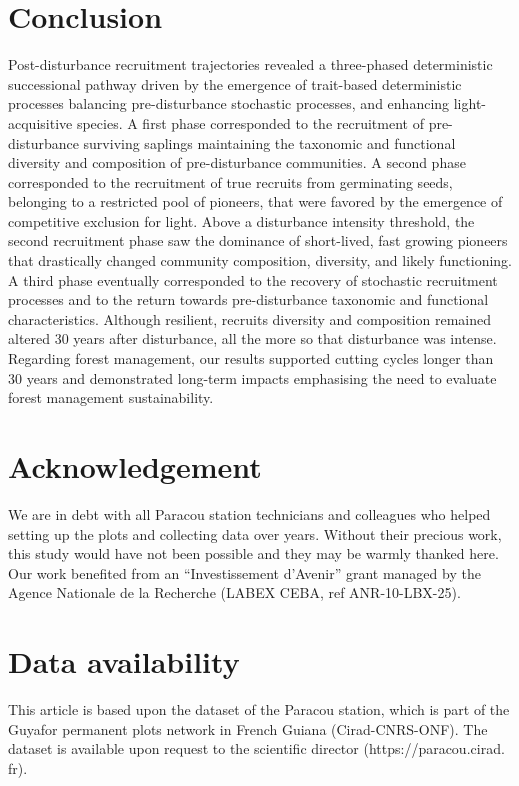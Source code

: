 \documentclass[fleqn,10pt]{ArtEcoFoG} %
\begin{document}
\section{Conclusion}\label{conclusion}

Post-disturbance recruitment trajectories revealed a three-phased
deterministic successional pathway driven by the emergence of
trait-based deterministic processes balancing pre-disturbance stochastic
processes, and enhancing light-acquisitive species. A first phase
corresponded to the recruitment of pre-disturbance surviving saplings
maintaining the taxonomic and functional diversity and composition of
pre-disturbance communities. A second phase corresponded to the
recruitment of true recruits from germinating seeds, belonging to a
restricted pool of pioneers, that were favored by the emergence of
competitive exclusion for light. Above a disturbance intensity
threshold, the second recruitment phase saw the dominance of
short-lived, fast growing pioneers that drastically changed community
composition, diversity, and likely functioning. A third phase eventually
corresponded to the recovery of stochastic recruitment processes and to
the return towards pre-disturbance taxonomic and functional
characteristics. Although resilient, recruits diversity and composition
remained altered 30 years after disturbance, all the more so that
disturbance was intense. Regarding forest management, our results
supported cutting cycles longer than 30 years and demonstrated long-term
impacts emphasising the need to evaluate forest management
sustainability. \color{black}

\section{Acknowledgement}\label{acknowledgement}

We are in debt with all Paracou station technicians and colleagues who
helped setting up the plots and collecting data over years. Without
their precious work, this study would have not been possible and they
may be warmly thanked here. Our work benefited from an ``Investissement
d'Avenir'' grant managed by the Agence Nationale de la Recherche (LABEX
CEBA, ref ANR-10-LBX-25).

\section{Data availability}\label{data-availability}

This article is based upon the dataset of the Paracou station, which is
part of the Guyafor permanent plots network in French Guiana
(Cirad-CNRS-ONF). The dataset is available upon request to the
scientific director (https://paracou.cirad. fr).
\end{document}
